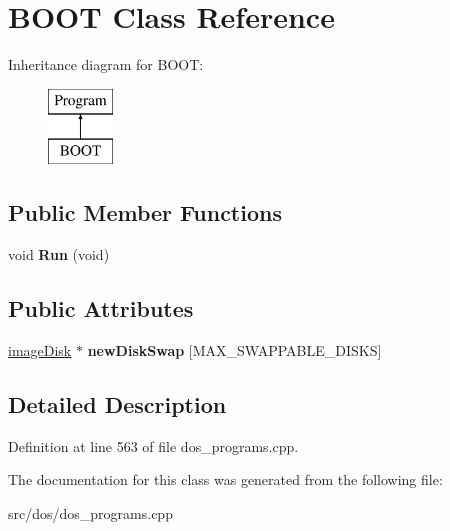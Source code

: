 \hypertarget{classBOOT}{\section{B\-O\-O\-T Class Reference}
\label{classBOOT}
}
Inheritance diagram for B\-O\-O\-T\-:\begin{figure}[H]
\begin{center}
\leavevmode
\includegraphics[height=2.000000cm]{classBOOT}
\end{center}
\end{figure}
\subsection*{Public Member Functions}
\begin{DoxyCompactItemize}
\item 
\hypertarget{classBOOT_a246ff7f80fc219360cdef4c3faa93d40}{void {\bfseries Run} (void)}\label{classBOOT_a246ff7f80fc219360cdef4c3faa93d40}

\end{DoxyCompactItemize}
\subsection*{Public Attributes}
\begin{DoxyCompactItemize}
\item 
\hypertarget{classBOOT_ab165a586fbff98d26e21fba090440209}{\hyperlink{classimageDisk}{image\-Disk} $\ast$ {\bfseries new\-Disk\-Swap} \mbox{[}M\-A\-X\-\_\-\-S\-W\-A\-P\-P\-A\-B\-L\-E\-\_\-\-D\-I\-S\-K\-S\mbox{]}}\label{classBOOT_ab165a586fbff98d26e21fba090440209}

\end{DoxyCompactItemize}


\subsection{Detailed Description}


Definition at line 563 of file dos\-\_\-programs.\-cpp.



The documentation for this class was generated from the following file\-:\begin{DoxyCompactItemize}
\item 
src/dos/dos\-\_\-programs.\-cpp\end{DoxyCompactItemize}
